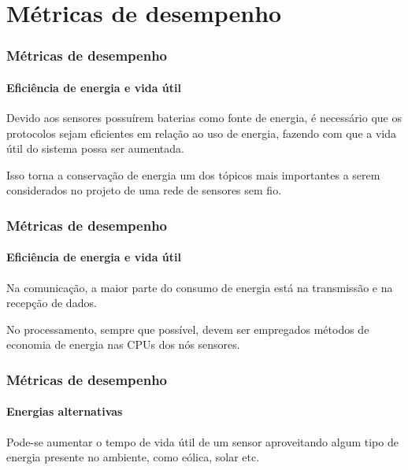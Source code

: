 \documentclass[notes]{beamer}
\begin{document}
\section{Métricas de desempenho}

\begin{frame}
\frametitle{Métricas de desempenho}
\framesubtitle{Eficiência de energia e vida útil}

\begin{block}

Devido aos sensores possuírem baterias como fonte de energia, é necessário que os protocolos sejam eficientes em relação ao uso de energia, fazendo com que a vida útil do sistema possa ser aumentada. 
\end{block} \pause

\begin{alertblock}

Isso torna a conservação de energia um dos tópicos mais importantes a serem considerados no projeto de uma rede de sensores sem fio.

\end{alertblock}

\end{frame}

\begin{frame}
\frametitle{Métricas de desempenho}
\framesubtitle{Eficiência de energia e vida útil}

\begin{block}

Na comunicação, a maior parte do consumo de energia está na transmissão e na recepção de dados. 

\end{block} \pause

\begin{block}

No processamento, sempre que possível, devem ser empregados métodos de economia de energia nas CPUs dos nós sensores.

\end{block}

\end{frame}

\begin{frame}
\frametitle{Métricas de desempenho}
\framesubtitle{Energias alternativas}

\begin{block}

Pode-se aumentar o tempo de vida útil de um sensor aproveitando algum tipo de energia presente no ambiente, como eólica, solar etc. 

\end{block}

\end{frame}
\end{document}
